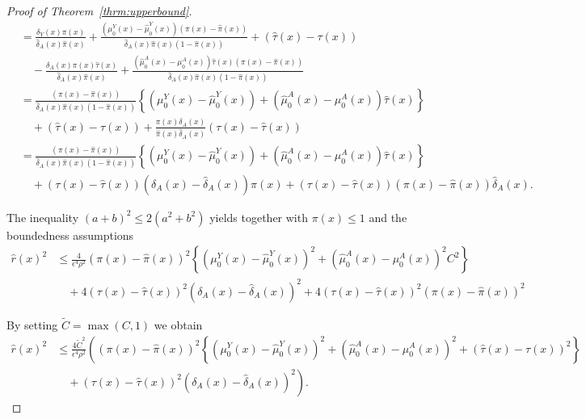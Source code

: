 \documentclass[nonatbib]{article}
\theoremstyle{definition}
\theoremstyle{plain}
\begin{document}
\begin{proof}[Proof of Theorem~\ref{thrm:upperbound}]
\begin{align}
   &= \frac{\delta_Y(x) \pi(x)}{\hat{\delta}_A(x) \hat{\pi}(x)} + \frac{\left(\mu_0^Y(x) - \hat{\mu}_0^Y(x)\right) \left(\pi(x) - \hat{\pi}(x)\right)}{\hat{\delta}_A(x) \hat{\pi}(x) \left(1 - \hat{\pi}(x) \right)} + \left(\hat{\tau}(x) - \tau(x)\right) \\
   & \quad - \frac{\delta_A(x) \pi(x) \hat{\tau}(x)}{\hat{\delta}_A(x) \hat{\pi}(x)} + \frac{\left(\hat{\mu}_0^A(x) - \mu_0^A(x)\right) \hat{\tau}(x) \left(\pi(x) - \hat{\pi}(x) \right)}{\hat{\delta}_A(x) \hat{\pi}(x) \left(1 - \hat{\pi}(x)\right)} \\
   &=\frac{\left(\pi(x) - \hat{\pi}(x) \right)}{\hat{\delta}_A(x) \hat{\pi}(x) \left(1 - \hat{\pi}(x)\right)}\left\{\left(\mu_0^Y(x) - \hat{\mu}_0^Y(x)\right) + \left(\hat{\mu}_0^A(x) - \mu_0^A(x)\right)\hat{\tau}(x)\right\} \\
   & \quad + \left(\hat{\tau}(x) - \tau(x)\right) + \frac{\pi(x) \delta_A(x)}{\hat{\pi}(x) \hat{\delta}_A(x)} \left(\tau(x) - \hat{\tau}(x)\right) \\
   &= \frac{\left(\pi(x) - \hat{\pi}(x) \right)}{\hat{\delta}_A(x) \hat{\pi}(x) \left(1 - \hat{\pi}(x)\right)}\left\{\left(\mu_0^Y(x) - \hat{\mu}_0^Y(x)\right) + \left(\hat{\mu}_0^A(x) - \mu_0^A(x)\right)\hat{\tau}(x)\right\} \\
   & \quad + \left(\tau(x) - \hat{\tau}(x)\right) \left(\delta_A(x) - \hat{\delta}_A(x)\right) \pi(x) + \left(\tau(x) - \hat{\tau}(x)\right) \left(\pi(x) - \hat{\pi}(x)\right) \hat{\delta}_A(x).
\end{align}

The inequality $(a+b)^2 \leq 2(a^2 + b^2)$ yields together with $\pi(x) \leq 1$ and the boundedness assumptions
\begin{align}
    \hat{r}(x)^2 & \leq \frac{4}{\epsilon^4 \rho^2} \left(\pi(x) - \hat{\pi}(x) \right)^2 \left\{\left(\mu_0^Y(x) - \hat{\mu}_0^Y(x)\right)^2 + \left(\hat{\mu}_0^A(x) - \mu_0^A(x)\right)^2C^2\right\} \\
    & \quad +4 \left(\tau(x) - \hat{\tau}(x)\right)^2 \left(\delta_A(x) - \hat{\delta}_A(x)\right)^2 + 4\left(\tau(x) - \hat{\tau}(x)\right)^2 \left(\pi(x) - \hat{\pi}(x)\right)^2 
\end{align}

By setting $\widetilde{C} = \max(C,1)$ we obtain
\begin{align}
    \hat{r}(x)^2 & \leq \frac{4\widetilde{C}^2}{\epsilon^4 \rho^2}\left( \left(\pi(x) - \hat{\pi}(x) \right)^2 \left\{\left(\mu_0^Y(x) - \hat{\mu}_0^Y(x)\right)^2 + \left(\hat{\mu}_0^A(x) - \mu_0^A(x)\right)^2 + \left(\hat{\tau}(x) - \tau(x)\right)^2\right\} \right.\\
    & \quad + \left. \left(\tau(x) - \hat{\tau}(x)\right)^2 \left(\delta_A(x) - \hat{\delta}_A(x)\right)^2 \right).
\end{align}


\end{proof}
\end{document}

